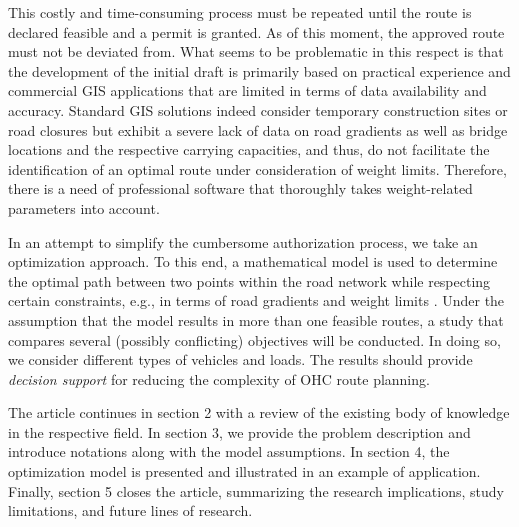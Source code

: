 This costly and time-consuming process must be repeated until the route is declared feasible and a permit is granted. As of this moment, the approved route must not be deviated from.
What seems to be problematic in this respect is that the development of the initial draft is primarily based on practical experience and commercial GIS applications that are limited in terms of data availability and accuracy.
Standard GIS solutions indeed consider temporary construction sites or road closures but exhibit a severe lack of data on road gradients as well as bridge locations and the respective carrying capacities, and thus, do not facilitate the identification of an optimal route under consideration of weight limits.
Therefore, there is a need of professional software that thoroughly takes weight-related parameters into account.
\par In an attempt to simplify the cumbersome authorization process, we take an optimization approach.
To this end, a mathematical model is used to determine the optimal path between two points within the road network while respecting certain constraints, e.g., in terms of road gradients and weight limits \cite{liedtke2012generation}.
Under the assumption that the model results in more than one feasible routes, a study that compares several (possibly conflicting) objectives will be conducted.
In doing so, we consider different types of vehicles and loads. The results should provide \textit{decision support} for reducing the complexity of OHC route planning. 
\par
The article continues in section 2 with a review of the existing body of knowledge in the respective field.
In section 3, we provide the problem description and introduce notations along with the model assumptions. In section 4, the optimization model is presented and illustrated in an example of application.
Finally, section 5 closes the article, summarizing the research implications, study limitations, and future lines of research.

